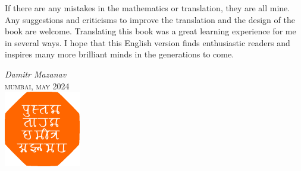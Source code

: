 If there are any mistakes in the mathematics or translation, they are all mine. Any suggestions and criticisms to improve the translation and the design of the book are welcome. Translating this book was a great learning experience for me in several ways. I hope that this English version finds enthusiastic readers and inspires many more brilliant minds in the generations to come.


\begin{flushright}
\emph{Damitr Mazanav}\\
\textsc{mumbai, may 2024}\\[10pt]
\includegraphics[width=0.25\textwidth]{figures/pustaktarak.pdf}
\end{flushright}

\clearpage